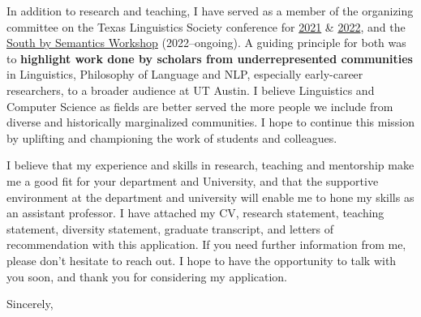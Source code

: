 \documentclass[11pt, letterpaper]{practical-letter}
\begin{document}
In addition to research and teaching, I have served as a member of the organizing committee on the Texas Linguistics Society conference for \href{http://tls.ling.utexas.edu/2021/}{2021} \& \href{http://tls.ling.utexas.edu/2022/}{2022}, and the \href{https://sites.utexas.edu/sxsemantics}{South by Semantics Workshop} (2022--ongoing). A guiding principle for both was to \textbf{highlight work done by scholars from underrepresented communities} in Linguistics, Philosophy of Language and NLP, especially early-career researchers, to a broader audience at UT Austin. I believe Linguistics and Computer Science as fields are better served the more people we include from diverse and historically marginalized communities. I hope to continue this mission by uplifting and championing the work of students and colleagues.

I believe that my experience and skills in research, teaching and mentorship make me a good fit for your department and University, and that the supportive environment at the department and university will enable me to hone my skills as an assistant professor. I have attached my CV, research statement, teaching statement, diversity statement, graduate transcript, and letters of recommendation with this application. If you need further information from me, please don't hesitate to reach out. I hope to have the opportunity to talk with you soon, and thank you for considering my application.

\closing{Sincerely,}
\end{document}

